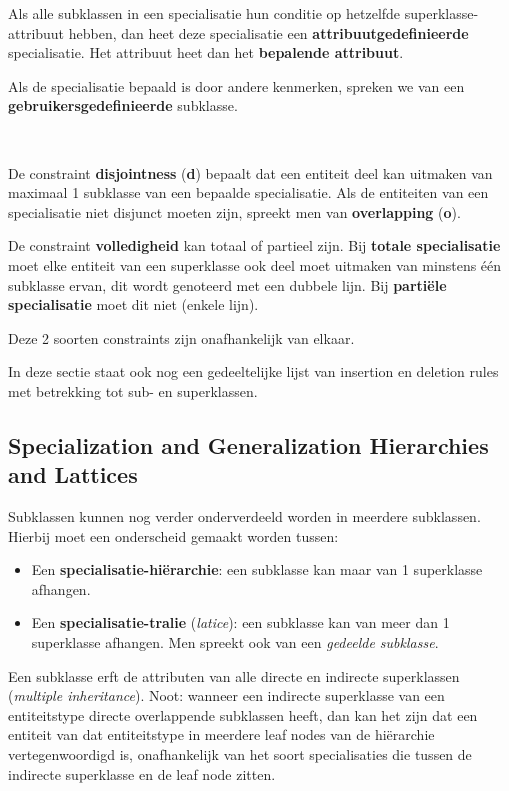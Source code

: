 Als alle subklassen in een specialisatie hun conditie op hetzelfde superklasse-attribuut hebben, dan heet deze specialisatie een \textbf{attribuutgedefinieerde} specialisatie. Het attribuut heet dan het \textbf{bepalende attribuut}.

Als de specialisatie bepaald is door andere kenmerken, spreken we van een \textbf{gebruikersgedefinieerde} subklasse.

~

\noindent De constraint \textbf{disjointness} (\textbf{d}) bepaalt dat een entiteit deel kan uitmaken van maximaal 1 subklasse van een bepaalde specialisatie. Als de entiteiten van een specialisatie niet disjunct moeten zijn, spreekt men van \textbf{overlapping} (\textbf{o}).

De constraint \textbf{volledigheid} kan totaal of partieel zijn. Bij \textbf{totale specialisatie} moet elke entiteit van een superklasse ook deel moet uitmaken van minstens \'e\'en subklasse ervan, dit wordt genoteerd met een dubbele lijn. Bij \textbf{parti\"ele specialisatie} moet dit niet (enkele lijn).

Deze 2 soorten constraints zijn onafhankelijk van elkaar.


In deze sectie staat ook nog een gedeeltelijke lijst van insertion en deletion rules met betrekking tot sub- en superklassen.
\subsection{Specialization and Generalization Hierarchies and Lattices}
Subklassen kunnen nog verder onderverdeeld worden in meerdere subklassen. Hierbij moet een onderscheid gemaakt worden tussen:
\begin{itemize}
\item Een \textbf{specialisatie-hi\"erarchie}: een subklasse kan maar van 1 superklasse afhangen.
\item Een \textbf{specialisatie-tralie} (\textit{latice}): een subklasse kan van meer dan 1 superklasse afhangen. Men spreekt ook van een \textit{gedeelde subklasse}. 
\end{itemize}
Een subklasse erft de attributen van alle directe en indirecte superklassen (\textit{multiple inheritance}). Noot: wanneer een indirecte superklasse van een entiteitstype directe overlappende subklassen heeft, dan kan het zijn dat een entiteit van dat entiteitstype in meerdere leaf nodes van de hi\"erarchie vertegenwoordigd is, onafhankelijk van het soort specialisaties die tussen de indirecte superklasse en de leaf node zitten.

